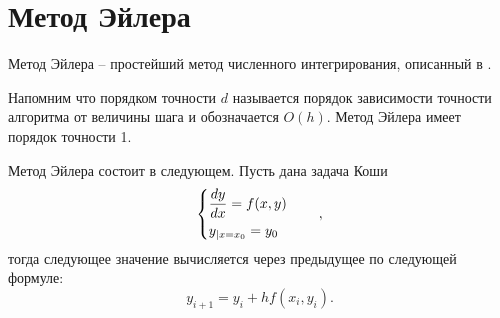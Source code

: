 \section{Метод Эйлера}
Метод Эйлера -- простейший метод численного интегрирования, описанный в
\cite[раздел 2, глава 7]{euler}.

Напомним что порядком точности $d$ называется порядок зависимости точности
алгоритма от величины шага и обозначается $O(h)$. Метод Эйлера имеет порядок
точности 1.

Метод Эйлера состоит в следующем. Пусть дана задача Коши
\begin{equation}\label{eq:koshi}
    \begin{dcases}
        \frac{dy}{dx} = f(x,y) \\
        y_{|x=x_0} = y_0
    \end{dcases}\qquad,
\end{equation}
тогда следующее значение вычисляется через предыдущее по следующей формуле:
\begin{equation}
    y_{i+1} = y_i + hf(x_i, y_i).
\end{equation}
